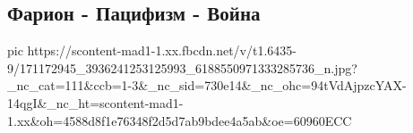  
 
 
 
 

\subsection{Фарион - Пацифизм - Война}

\ifcmt
  pic https://scontent-mad1-1.xx.fbcdn.net/v/t1.6435-9/171172945_3936241253125993_6188550971333285736_n.jpg?_nc_cat=111&ccb=1-3&_nc_sid=730e14&_nc_ohc=94tVdAjpzcYAX-14qgI&_nc_ht=scontent-mad1-1.xx&oh=4588d8f1e76348f2d5d7ab9bdee4a5ab&oe=60960ECC
\fi

